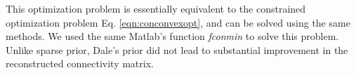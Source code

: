 This optimization problem is essentially equivalent to the constrained optimization problem Eq. \eqref{eqn:conconvexopt}, and can be solved using the same methods. We used the same Matlab's function {\em fconmin} to solve this problem. Unlike sparse prior, Dale's prior did not lead to substantial improvement in the reconstructed connectivity matrix.
